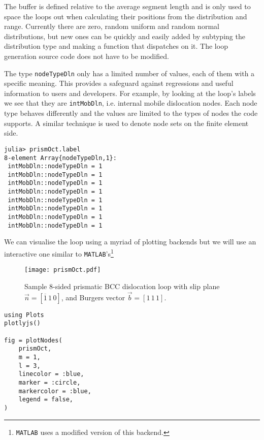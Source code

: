 The buffer is defined relative to the average segment length and is only used to space the loops out when calculating their positions from the distribution and range. Currently there are zero, random uniform and random normal distributions, but new ones can be quickly and easily added by subtyping the distribution type and making a function that dispatches on it. The loop generation source code does not have to be modified.

The type \texttt{nodeTypeDln} only has a limited number of values, each of them with a specific meaning. This provides a safeguard against regressions and useful information to users and developers. For example, by looking at the loop's labels we see that they are \texttt{intMobDln}, i.e. internal mobile dislocation nodes. Each node type behaves differently and the values are limited to the types of nodes the code supports. A similar technique is used to denote node sets on the finite element side.
\begin{verbatim}
julia> prismOct.label
8-element Array{nodeTypeDln,1}:
 intMobDln::nodeTypeDln = 1
 intMobDln::nodeTypeDln = 1
 intMobDln::nodeTypeDln = 1
 intMobDln::nodeTypeDln = 1
 intMobDln::nodeTypeDln = 1
 intMobDln::nodeTypeDln = 1
 intMobDln::nodeTypeDln = 1
 intMobDln::nodeTypeDln = 1
\end{verbatim}

We can visualise the loop using a myriad of plotting backends but we will use an interactive one similar to \texttt{MATLAB}'s\footnote{\texttt{MATLAB} uses a modified version of this backend.}
\begin{figure}
    \centering
    \texttt{[image: prismOct.pdf]}
    \caption[Sample 8-sided prismatic BCC dislocation loop.]{Sample 8-sided prismatic BCC dislocation loop with slip plane $ \vec{n} = [\overline{1}\, 1\, 0] $, and Burgers vector $\vec{b} = [1\, 1\, 1]$.}
\end{figure}

\begin{verbatim}
using Plots
plotlyjs()

fig = plotNodes(
    prismOct,
    m = 1,
    l = 3,
    linecolor = :blue,
    marker = :circle,
    markercolor = :blue,
    legend = false,
)
\end{verbatim}


